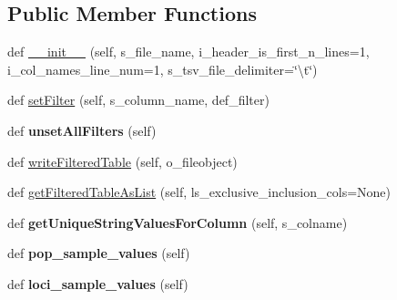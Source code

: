 \subsection*{Public Member Functions}
\begin{DoxyCompactItemize}
\item 
def \hyperlink{classnegui_1_1pgutilityclasses_1_1NeEstimationTableFileManager_afa45110200b2dfdd9a8ddc8d57ad8abb}{\+\_\+\+\_\+init\+\_\+\+\_\+} (self, s\+\_\+file\+\_\+name, i\+\_\+header\+\_\+is\+\_\+first\+\_\+n\+\_\+lines=1, i\+\_\+col\+\_\+names\+\_\+line\+\_\+num=1, s\+\_\+tsv\+\_\+file\+\_\+delimiter=\char`\"{}\textbackslash{}t\char`\"{})
\item 
def \hyperlink{classnegui_1_1pgutilityclasses_1_1NeEstimationTableFileManager_ad99b7e0a807b3bc0b52ffe7098ae261d}{set\+Filter} (self, s\+\_\+column\+\_\+name, def\+\_\+filter)
\item 
def {\bfseries unset\+All\+Filters} (self)\hypertarget{classnegui_1_1pgutilityclasses_1_1NeEstimationTableFileManager_a019c17c5d71790a0f89296d8a1381ae9}{}\label{classnegui_1_1pgutilityclasses_1_1NeEstimationTableFileManager_a019c17c5d71790a0f89296d8a1381ae9}

\item 
def \hyperlink{classnegui_1_1pgutilityclasses_1_1NeEstimationTableFileManager_aa78d2a283a06ccac89f5c162c18ecc30}{write\+Filtered\+Table} (self, o\+\_\+fileobject)
\item 
def \hyperlink{classnegui_1_1pgutilityclasses_1_1NeEstimationTableFileManager_ab3862eefd07fd5fd3445b6cab165c6f9}{get\+Filtered\+Table\+As\+List} (self, ls\+\_\+exclusive\+\_\+inclusion\+\_\+cols=None)
\item 
def {\bfseries get\+Unique\+String\+Values\+For\+Column} (self, s\+\_\+colname)\hypertarget{classnegui_1_1pgutilityclasses_1_1NeEstimationTableFileManager_a1e59f0a7fbae468697237a7fac8e5815}{}\label{classnegui_1_1pgutilityclasses_1_1NeEstimationTableFileManager_a1e59f0a7fbae468697237a7fac8e5815}

\item 
def {\bfseries pop\+\_\+sample\+\_\+values} (self)\hypertarget{classnegui_1_1pgutilityclasses_1_1NeEstimationTableFileManager_a86fa864b22f8bd547ae90d9ca842e803}{}\label{classnegui_1_1pgutilityclasses_1_1NeEstimationTableFileManager_a86fa864b22f8bd547ae90d9ca842e803}

\item 
def {\bfseries loci\+\_\+sample\+\_\+values} (self)\hypertarget{classnegui_1_1pgutilityclasses_1_1NeEstimationTableFileManager_afeaa81e335a5fc9cbd78536c6e415099}{}\label{classnegui_1_1pgutilityclasses_1_1NeEstimationTableFileManager_afeaa81e335a5fc9cbd78536c6e415099}


\end{DoxyCompactItemize}
